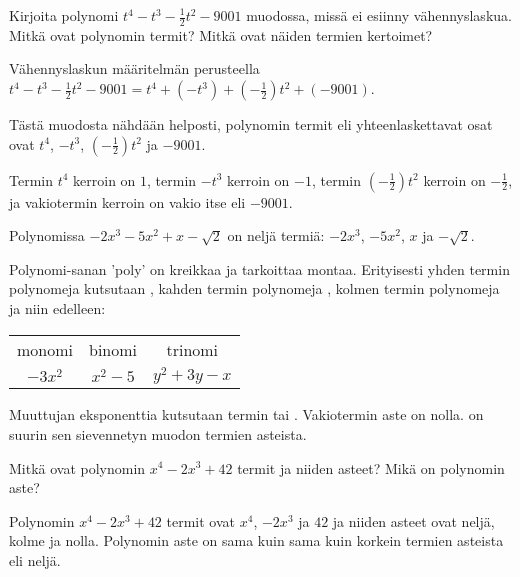 \begin{esimerkki}

Kirjoita polynomi $t^4-t^3-\frac{1}{2}t^2-9001$ muodossa, missä ei esiinny vähennyslaskua. Mitkä ovat polynomin termit? Mitkä ovat näiden termien kertoimet? 

	\begin{esimratk}

Vähennyslaskun määritelmän perusteella $t^4-t^3-\frac{1}{2}t^2-9001 = t^4+(-t^3)+(-\frac{1}{2})t^2+(-9001)$.

Tästä muodosta nähdään helposti, polynomin termit eli yhteenlaskettavat osat ovat $t^4$, $-t^3$, $(-\frac{1}{2})t^2$ ja $-9001$.

Termin $t^4$ kerroin on $1$, termin $-t^3$ kerroin on $-1$, termin $(-\frac{1}{2})t^2$ kerroin on $-\frac{1}{2}$, ja vakiotermin kerroin on vakio itse eli $-9001$.

	\end{esimratk}

\end{esimerkki}

\begin{esimerkki}

Polynomissa $-2x^3-5x^2+x-\sqrt{2}$ on neljä termiä: $-2x^3$, $-5x^2$, $x$ ja $-\sqrt{2}$.

\end{esimerkki}


Polynomi-sanan 'poly' on kreikkaa ja tarkoittaa montaa. Erityisesti yhden termin polynomeja kutsutaan , kahden termin polynomeja , kolmen termin polynomeja  ja niin edelleen:
\begin{center}\begin{tabular}{ccc}
monomi	& binomi 	&	trinomi \\
$-3x^2$   &	$x^2-5$	& $y^2+3y-x$
 \end{tabular} \end{center}

Muuttujan eksponenttia kutsutaan termin  tai . Vakiotermin aste on nolla.  on suurin sen sievennetyn muodon termien asteista.

\begin{esimerkki}
    Mitkä ovat polynomin $x^4-2x^3+42$ termit ja niiden asteet? Mikä on polynomin aste?
    \begin{esimvast}
        Polynomin $x^4-2x^3+42$ termit ovat $x^4$, $-2x^3$ ja $42$ ja niiden asteet ovat
        neljä, kolme ja nolla. Polynomin aste on sama kuin sama kuin
        korkein termien asteista eli neljä.
    \end{esimvast}
\end{esimerkki}

